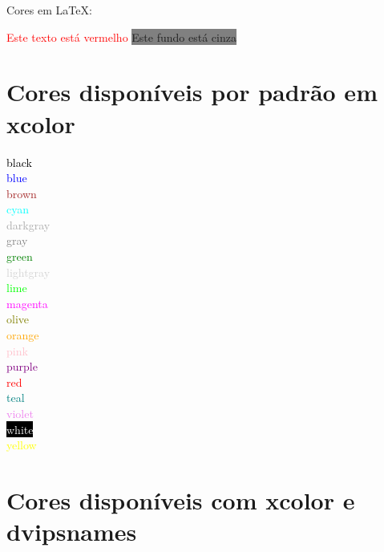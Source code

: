 \documentclass{article}
\begin{document}
	
Cores em LaTeX:	

\textcolor{red}{Este texto está vermelho} %
\colorbox{gray}{Este fundo está cinza} %
	
\section{Cores disponíveis por padrão em xcolor}

\textcolor{black}{black}\\
\textcolor{blue}{blue}\\
\textcolor{brown}{brown}\\
\textcolor{cyan}{cyan}\\
\textcolor{darkgray}{darkgray}\\
\textcolor{gray}{gray}\\
\textcolor{green}{green}\\
\textcolor{lightgray}{lightgray}\\
\textcolor{lime}{lime}\\
\textcolor{magenta}{magenta}\\
\textcolor{olive}{olive}\\
\textcolor{orange}{orange}\\
\textcolor{pink}{pink}\\
\textcolor{purple}{purple}\\
\textcolor{red}{red}\\
\textcolor{teal}{teal}\\
\textcolor{violet}{violet}\\
\colorbox{black}{\textcolor{white}{white}}\\
\textcolor{yellow}{yellow}

\section{Cores disponíveis com xcolor e dvipsnames}
\end{document}
